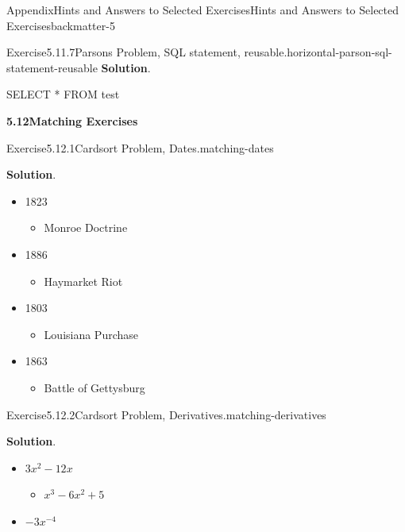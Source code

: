 \documentclass[oneside,10pt,]{book}
\newcommand{\blocktitlefont}{\relax}
\numberwithin{equation}{section}
\begin{document}
\begin{solutions-chapter}{Appendix}{Hints and Answers to Selected Exercises}{}{Hints and Answers to Selected Exercises}{}{}{backmatter-5}
\begin{divisionsolution}{Exercise}{5.11.7}{Parsons Problem, SQL statement, reusable.}{horizontal-parson-sql-statement-reusable}
\noindent\textbf{\blocktitlefont Solution}.\hypertarget{horizontal-parson-sql-statement-reusable-3-back}{}\quad{}%
\begin{codedisplay}
SELECT * FROM test
\end{codedisplay}
%
\end{divisionsolution}%
\par\medskip
\noindent\textbf{\Large{}5.12\space\textperiodcentered\space{}Matching Exercises}
\begin{divisionsolution}{Exercise}{5.12.1}{Cardsort Problem, Dates.}{matching-dates}%
\par\smallskip%
\noindent\textbf{\blocktitlefont Solution}.\hypertarget{matching-dates-4-back}{}\quad{}%
\begin{itemize}[label=\textbullet]
\item{}1823%
\begin{itemize}[label=$\circ$]
\item{}Monroe Doctrine%
\end{itemize}
%
\item{}1886%
\begin{itemize}[label=$\circ$]
\item{}Haymarket Riot%
\end{itemize}
%
\item{}1803%
\begin{itemize}[label=$\circ$]
\item{}Louisiana Purchase%
\end{itemize}
%
\item{}1863%
\begin{itemize}[label=$\circ$]
\item{}Battle of Gettysburg%
\end{itemize}
%
\end{itemize}
%
\end{divisionsolution}%
\begin{divisionsolution}{Exercise}{5.12.2}{Cardsort Problem, Derivatives.}{matching-derivatives}%
\par\smallskip%
\noindent\textbf{\blocktitlefont Solution}.\hypertarget{matching-derivatives-4-back}{}\quad{}%
\begin{itemize}[label=\textbullet]
\item{}\(3x^2-12x\)%
\begin{itemize}[label=$\circ$]
\item{}\(x^3-6x^2+5\)%
\end{itemize}
%
\item{}\(-3x^{-4}\)%
\begin{itemize}[label=$\circ$]

\end{itemize}
\end{itemize}
\end{divisionsolution}
\end{solutions-chapter}
\end{document}
